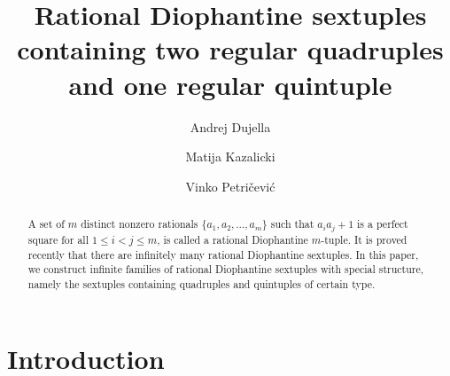 \documentclass[a4paper]{amsart}
\title[Rational Diophantine sextuples]
{Rational Diophantine sextuples containing two regular quadruples and one regular quintuple}
\theoremstyle{plain}
\theoremstyle{definition}
\begin{document}
\date{}


\author[A. Dujella]{Andrej Dujella}
\address{
Department of Mathematics\\
Faculty of Science\\
University of Zagreb\\
Bijeni{\v c}ka cesta 30, 10000 Zagreb, Croatia
}

\author[M. Kazalicki]{Matija Kazalicki}
\address{
Department of Mathematics\\
Faculty of Science\\
University of Zagreb\\
Bijeni{\v c}ka cesta 30, 10000 Zagreb, Croatia
}

\author[V. Petri\v{c}evi\'c]{Vinko Petri\v{c}evi\'c}
\address{
Department of Mathematics\\
Faculty of Science\\
University of Zagreb\\
Bijeni{\v c}ka cesta 30, 10000 Zagreb, Croatia
}


\begin{abstract}
A set of $m$ distinct nonzero rationals $\{a_1,a_2,\ldots,a_m\}$
such that  $a_ia_j+1$ is a perfect square for all $1\leq i<j\leq m$, is called a rational Diophantine
$m$-tuple. It is proved recently that there are infinitely many rational Diophantine sextuples.
In this paper, we construct infinite families of rational Diophantine sextuples with special structure,
namely the sextuples containing quadruples and quintuples of certain type.
\end{abstract}


\maketitle

\section{Introduction}
\end{document}
